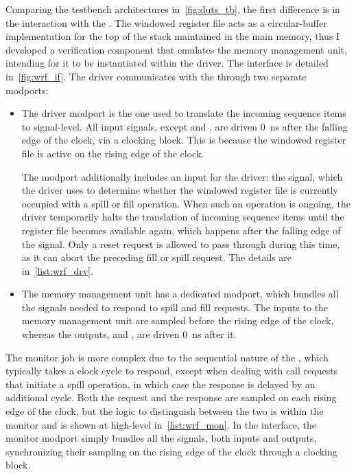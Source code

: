\noindent Comparing the testbench architectures in~\cref{fig:duts_tb}, the first difference is in the interaction with the \dut. The windowed register file acts as a circular-buffer implementation for the top of the stack maintained in the main memory, thus I developed a verification component that emulates the memory management unit, intending for it to be instantiated within the driver. The interface is detailed in~\cref{fig:wrf_if}. The driver communicates with the \dut through two separate modports:
\begin{itemize}
    \item The driver modport is the one used to translate the incoming sequence items to signal-level. All \dut input signals, except  and , are driven \qty{0}{\nano\second} after the falling edge of the clock, via a clocking block. This is because the windowed register file is active on the rising edge of the clock.

    The modport additionally includes an input for the driver: the  signal, which the driver uses to determine whether the windowed register file is currently occupied with a spill or fill operation. When such an operation is ongoing, the driver temporarily halts the translation of incoming sequence items until the register file becomes available again, which happens after the falling edge of the  signal. Only a reset request is allowed to pass through during this time, as it can abort the preceding fill or spill request. The \sv details are in~\cref{list:wrf_drv}.

    \item The memory management unit has a dedicated modport, which bundles all the signals needed to respond to spill and fill requests. The inputs to the memory management unit are sampled  before the rising edge of the clock, whereas the outputs,  and , are driven \qty{0}{\nano\second} after it.
\end{itemize}
The monitor job is more complex due to the sequential nature of the \dut, which typically takes a clock cycle to respond, except when dealing with call requests that initiate a spill operation, in which case the response is delayed by an additional cycle. Both the request and the response are sampled on each rising edge of the clock, but the logic to distinguish between the two is within the monitor and is shown at high-level in~\cref{list:wrf_mon}. In the interface, the monitor modport simply bundles all the \dut signals, both inputs and outputs, synchronizing their sampling on the rising edge of the clock through a clocking block.

